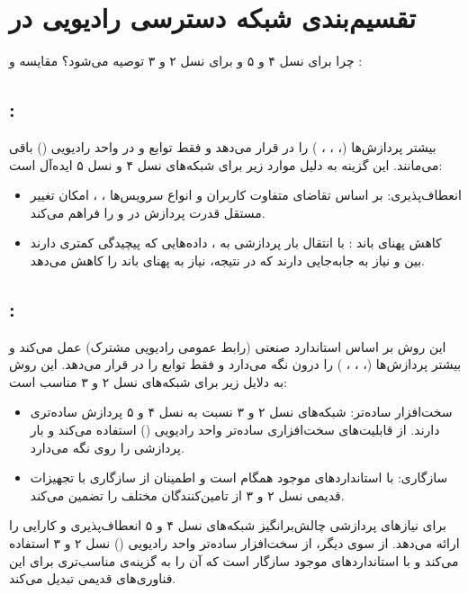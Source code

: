 \documentclass[landscape, 12pt]{report}
\begin{document}
\section*{
تقسیم‌بندی شبکه دسترسی رادیویی 
 در
}
چرا  برای نسل ۴ و ۵ و  برای نسل ۲ و ۳ توصیه می‌شود؟
مقایسه  و :

\subsection*{ :}
بیشتر پردازش‌ها (، ، ، ) را در  قرار می‌دهد و فقط توابع  و 
 در واحد رادیویی () باقی می‌مانند. این گزینه به دلیل موارد زیر برای شبکه‌های نسل ۴ و نسل ۵ ایده‌آل است:
\begin{itemize}
    \item انعطاف‌پذیری: بر اساس تقاضای متفاوت کاربران و انواع سرویس‌ها ، ،  امکان تغییر مستقل قدرت پردازش در  و  را فراهم می‌کند.
    \item کاهش پهنای باند : با انتقال بار پردازشی به ، داده‌هایی که پیچیدگی کمتری دارند بین  و  نیاز به جابه‌جایی دارند که در نتیجه، نیاز به پهنای باند  را کاهش می‌دهد.
\end{itemize}

\subsection*{ :}
این روش بر اساس استاندارد صنعتی  (رابط عمومی رادیویی مشترک) عمل می‌کند و بیشتر پردازش‌ها (، ، ، ) را درون  نگه می‌دارد و فقط توابع  را در  قرار می‌دهد. این روش به دلایل زیر برای شبکه‌های نسل ۲ و ۳ مناسب است:
\begin{itemize}
    \item سخت‌افزار ساده‌تر: شبکه‌های نسل ۲ و ۳ نسبت به نسل ۴ و ۵ پردازش ساده‌تری دارند.  از قابلیت‌های سخت‌افزاری ساده‌تر واحد رادیویی () استفاده می‌کند و بار پردازشی را روی  نگه می‌دارد.
    \item سازگاری:  با استانداردهای موجود  همگام است و اطمینان از سازگاری با تجهیزات قدیمی نسل ۲ و ۳ از تامین‌کنندگان مختلف را تضمین می‌کند.
\end{itemize}

 برای نیازهای پردازشی چالش‌برانگیز شبکه‌های نسل ۴ و ۵ انعطاف‌پذیری و کارایی را ارائه می‌دهد. از سوی دیگر،  از سخت‌افزار ساده‌تر واحد رادیویی () نسل ۲ و ۳ استفاده می‌کند و با استانداردهای موجود سازگار است که آن را به گزینه‌ی مناسب‌تری برای این فناوری‌های قدیمی تبدیل می‌کند.
\end{document}
